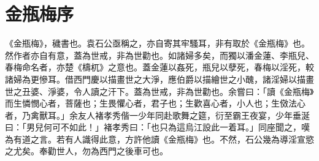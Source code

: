\chapter*{金瓶梅序}


《金瓶梅》，穢書也。袁石公亟稱之，亦自寄其牢騷耳，非有取於《金瓶梅》也。然作者亦自有意，蓋為世戒，非為世勸也。如諸婦多矣，而獨以潘金蓮、李瓶兒、春梅命名者，亦楚《檮杌》之意也。蓋金蓮以姦死，瓶兒以孽死，春梅以淫死，較諸婦為更慘耳。借西門慶以描畫世之大淨，應伯爵以描繪世之小醜，諸淫婦以描畫世之丑婆、淨婆，令人讀之汗下。蓋為世戒，非為世勸也。余嘗曰：「讀《金瓶梅》而生憐憫心者，菩薩也；生畏懼心者，君子也；生歡喜心者，小人也；生傚法心者，乃禽獸耳。」余友人褚孝秀偕一少年同赴歌舞之筵，衍至霸王夜宴，少年垂涎曰：「男兒何可不如此！」褚孝秀曰：「也只為這烏江設此一着耳。」同座聞之，嘆為有道之言。若有人識得此意，方許他讀《金瓶梅》也。不然，石公幾為導淫宣慾之尤矣。奉勸世人，勿為西門之後車可也。

\begin{quotation}
\end{quotation}

